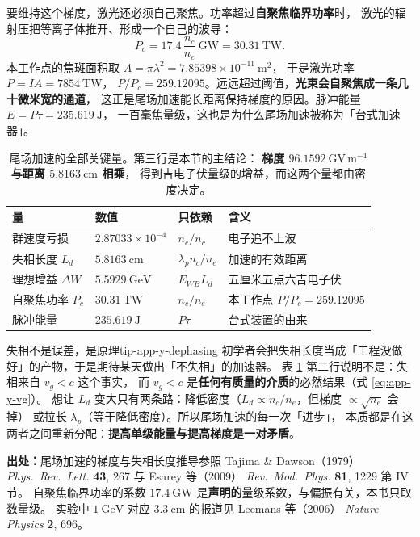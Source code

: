 要维持这个梯度，激光还必须自己聚焦。功率超过\textbf{自聚焦临界功率}时，
激光的辐射压把等离子体推开、形成一个自己的波导：
\begin{equation}
P_c = 17.4\,\frac{n_c}{n_e}\ \mathrm{GW} = 30.31\ \mathrm{TW}.
\label{eq:app-y-pc}
\end{equation}
本工作点的焦斑面积取 $A = \pi\lambda^2 = 7.85398\times10^{-11}\ \mathrm{m^2}$，
于是激光功率 $P = I A = 7854\ \mathrm{TW}$，
$P/P_c = 259.12095$。远远超过阈值，\textbf{光束会自聚焦成一条几十微米宽的通道}，
这正是尾场加速能长距离保持梯度的原因。脉冲能量 $E = P\tau = 235.619\ \mathrm{J}$，
一百毫焦量级，这也是为什么尾场加速被称为「台式加速器」。

\begin{table}[htbp]
\centering
\small
\caption{尾场加速的全部关键量。第三行是本节的主结论：
\textbf{梯度 $96.1592\ \mathrm{GV\,m^{-1}}$ 与距离 $5.8163\ \mathrm{cm}$ 相乘}，
得到吉电子伏量级的增益，而这两个量都由密度决定。}
\label{tab:app-y-lwfa}
\begin{tabular}{p{3.4cm}p{3.2cm}p{3.3cm}p{3.4cm}}
\toprule
量 & 数值 & 只依赖 & 含义 \\
\midrule
群速度亏损 & $2.87033\times10^{-4}$ & $n_e/n_c$ & 电子追不上波 \\
失相长度 $L_d$ & $5.8163\ \mathrm{cm}$ & $\lambda_p n_c/n_e$ & 加速的有效距离 \\
理想增益 $\Delta W$ & $5.5929\ \mathrm{GeV}$ & $E_{WB}L_d$ & 五厘米五点六吉电子伏 \\
自聚焦功率 $P_c$ & $30.31\ \mathrm{TW}$ & $n_c/n_e$ & 本工作点 $P/P_c = 259.12095$ \\
脉冲能量 & $235.619\ \mathrm{J}$ & $P\tau$ & 台式装置的由来 \\
\bottomrule
\end{tabular}

\end{table}

\begin{tip}{失相不是误差，是原理}{tip-app-y-dephasing}
初学者会把失相长度当成「工程没做好」的产物，于是期待某天做出「不失相」的加速器。
表 \ref{tab:app-y-lwfa} 第二行说明不是：失相来自 $v_g<c$ 这个事实，
而 $v_g<c$ 是\textbf{任何有质量的介质}的必然结果（式 \eqref{eq:app-y-vg}）。
想让 $L_d$ 变大只有两条路：降低密度（$L_d\propto n_c/n_e$，但梯度 $\propto\sqrt{n_e}$ 会掉）
或拉长 $\lambda_p$（等于降低密度）。所以尾场加速的每一次「进步」，
本质都是在这两者之间重新分配：\textbf{提高单级能量与提高梯度是一对矛盾}。
\end{tip}

{\footnotesize
\textbf{出处：}尾场加速的梯度与失相长度推导参照 Tajima \& Dawson（1979）
\emph{Phys.\ Rev.\ Lett.} \textbf{43}, 267 与 Esarey 等（2009）
\emph{Rev.\ Mod.\ Phys.} \textbf{81}, 1229 第 IV 节。
自聚焦临界功率的系数
$17.4\ \mathrm{GW}$ 是\textbf{声明的}量级系数，与偏振有关，本书只取数量级。
实验中 $1\ \mathrm{GeV}$ 对应 $3.3\ \mathrm{cm}$ 的报道见 Leemans 等（2006）
\emph{Nature Physics} \textbf{2}, 696。
}

